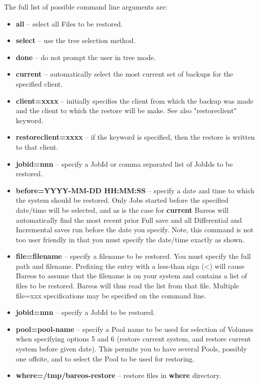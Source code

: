 The full list of possible command line arguments are:

\begin{itemize}
\item {\bf all} -- select all Files to be restored.
\item {\bf select} -- use the tree selection method.
\item {\bf done} -- do not prompt the user in tree mode.
\item {\bf current} -- automatically select the most current set of  backups
   for the specified client.
\item {\bf client=xxxx} -- initially specifies the client from which the
   backup was made and the client to which the restore will be make.  See also
   "restoreclient" keyword.
\item {\bf restoreclient=xxxx} -- if the keyword is specified, then the
   restore is written to that client.
\item {\bf jobid=nnn} -- specify a JobId or comma separated list of  JobIds to
   be restored.
\item {\bf before=YYYY-MM-DD HH:MM:SS} -- specify a date and time to  which
   the system should be restored. Only Jobs started before  the specified
   date/time will be selected, and as is the case  for {\bf current} Bareos will
   automatically find the most  recent prior Full save and all Differential and
   Incremental  saves run before the date you specify. Note, this command is  not
   too user friendly in that you must specify the date/time  exactly as shown.
\item {\bf file=filename} -- specify a filename to be restored. You  must
   specify the full path and filename. Prefixing the entry  with a less-than
   sign
   ({\textless}) will cause Bareos to assume that the  filename is on your system and
   contains a list of files to be  restored. Bareos will thus read the list from
   that file. Multiple  file=xxx specifications may be specified on the command
   line.
\item {\bf jobid=nnn} -- specify a JobId to be restored.
\item {\bf pool=pool-name} -- specify a Pool name to be used for selection  of
   Volumes when specifying options 5 and 6 (restore current system,  and restore
   current system before given date). This permits you to  have several Pools,
   possibly one offsite, and to select the Pool to  be used for restoring.
\item {\bf where=/tmp/bareos-restore} -- restore files in {\bf where} directory.

\end{itemize}
